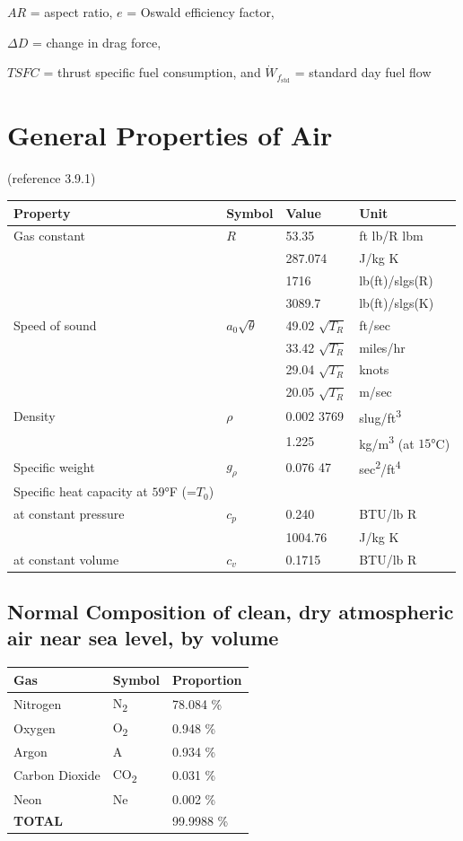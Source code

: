 \documentclass[
]{book}
\begin{document}
\(AR\) = aspect ratio, \(e\) = Oswald efficiency factor,

\(\Delta D\) = change in drag force,

\(TSFC\) = thrust specific fuel consumption, and
\(\dot{W}_{f_{\mathrm{std}}}\) = standard day fuel flow

\hypertarget{general-properties-of-air}{%
\section{General Properties of Air}\label{general-properties-of-air}}

(reference 3.9.1)

\begin{longtable}[]{@{}llll@{}}
\toprule
Property & Symbol & Value & Unit\tabularnewline
\midrule
\endhead
Gas constant & \(R\) & 53.35 & ft lb/R lbm\tabularnewline
& & 287.074 & J/kg K\tabularnewline
& & 1716 & lb(ft)/slgs(R)\tabularnewline
& & 3089.7 & lb(ft)/slgs(K)\tabularnewline
Speed of sound & \(a_0 \sqrt{\theta}\) & 49.02 \(\sqrt{T_R}\) & ft/sec\tabularnewline
& & 33.42 \(\sqrt{T_R}\) & miles/hr\tabularnewline
& & 29.04 \(\sqrt{T_R}\) & knots\tabularnewline
& & 20.05 \(\sqrt{T_R}\) & m/sec\tabularnewline
Density & \(\rho\) & 0.002 3769 & slug/ft\textsuperscript{3}\tabularnewline
& & 1.225 & kg/m\textsuperscript{3} (at \(15°\)C)\tabularnewline
Specific weight & \(g_\rho\) & 0.076 47 & sec\textsuperscript{2}/ft\textsuperscript{4}\tabularnewline
Specific heat capacity at \(59°\)F (=\(T_0\)) & & &\tabularnewline
at constant pressure & \(c_p\) & 0.240 & BTU/lb R\tabularnewline
& & 1004.76 & J/kg K\tabularnewline
at constant volume & \(c_v\) & 0.1715 & BTU/lb R\tabularnewline
\bottomrule
\end{longtable}

\hypertarget{normal-composition-of-clean-dry-atmospheric-air-near-sea-level-by-volume}{%
\subsection*{Normal Composition of clean, dry atmospheric air near sea level, by volume}\label{normal-composition-of-clean-dry-atmospheric-air-near-sea-level-by-volume}}

\begin{longtable}[]{@{}lll@{}}
\toprule
Gas & Symbol & Proportion\tabularnewline
\midrule
\endhead
Nitrogen & N\textsubscript{2} & 78.084 \%\tabularnewline
Oxygen & O\textsubscript{2} & 0.948 \%\tabularnewline
Argon & A & 0.934 \%\tabularnewline
Carbon Dioxide & CO\textsubscript{2} & 0.031 \%\tabularnewline
Neon & Ne & 0.002 \%\tabularnewline
\textbf{TOTAL} & & 99.9988 \%\tabularnewline
\bottomrule
\end{longtable}
\end{document}
